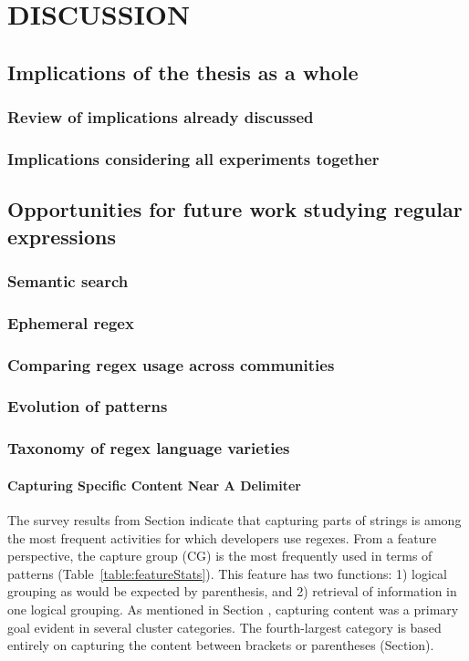 \chapter{DISCUSSION}
\section{Implications of the thesis as a whole}
\subsection{Review of implications already discussed}
\subsection{Implications considering all experiments together}

\section{Opportunities for future work studying regular expressions}
\subsection{Semantic search}
\subsection{Ephemeral regex}
\subsection{Comparing regex usage across communities}
\subsection{Evolution of patterns}
\subsection{Taxonomy of regex language varieties}

\subsubsection{Capturing Specific Content Near A Delimiter}
The survey results from Section
 indicate that capturing parts of strings is among the most frequent activities for which developers use regexes.
From a feature perspective, the capture group (CG) is the most frequently used in terms of patterns (Table~\ref{table:featureStats}).  This feature has two functions: 1) logical grouping as would be expected by parenthesis, and 2) retrieval of information in one logical grouping.  As mentioned in Section
, capturing content was a primary goal evident in several cluster categories.  The fourth-largest category is based entirely on capturing the content between brackets or parentheses (Section).

